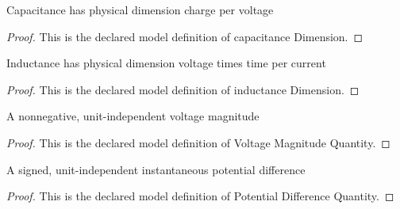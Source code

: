 \begin{definition}
  \label{def:physics:phyx-mini-0934:phyxminiproblems-problemphyxmini0934-capacitancedimension}
  Capacitance has physical dimension charge per voltage
\end{definition}
\begin{proof}
  This is the declared model definition of capacitance Dimension.
\end{proof}
\begin{definition}
  \label{def:physics:phyx-mini-0934:phyxminiproblems-problemphyxmini0934-inductancedimension}
  Inductance has physical dimension voltage times time per current
\end{definition}
\begin{proof}
  This is the declared model definition of inductance Dimension.
\end{proof}
\begin{definition}
  \label{def:physics:phyx-mini-0934:phyxminiproblems-problemphyxmini0934-voltagemagnitudequantity}
  A nonnegative, unit-independent voltage magnitude
\end{definition}
\begin{proof}
  This is the declared model definition of Voltage Magnitude Quantity.
\end{proof}
\begin{definition}
  \label{def:physics:phyx-mini-0934:phyxminiproblems-problemphyxmini0934-potentialdifferencequantity}
  A signed, unit-independent instantaneous potential difference
\end{definition}
\begin{proof}
  This is the declared model definition of Potential Difference Quantity.
\end{proof}
